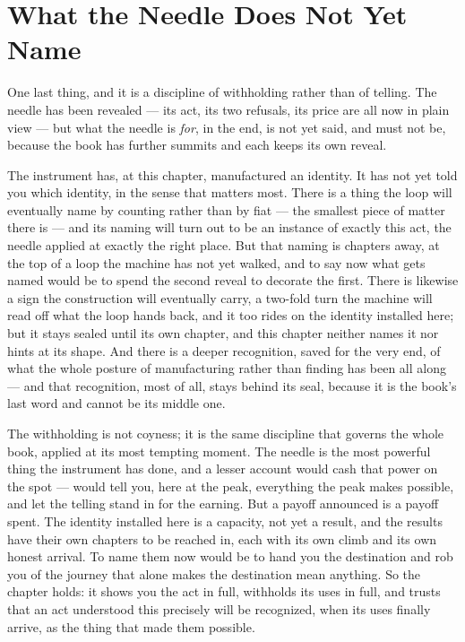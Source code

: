 \section{What the Needle Does Not Yet Name}

One last thing, and it is a discipline of withholding rather than of telling. The needle has been revealed --- its
act, its two refusals, its price are all now in plain view --- but what the needle is \emph{for}, in the end, is
not yet said, and must not be, because the book has further summits and each keeps its own reveal.

The instrument has, at this chapter, manufactured an identity. It has not yet told you which identity, in the
sense that matters most. There is a thing the loop will eventually name by counting rather than by fiat --- the
smallest piece of matter there is --- and its naming will turn out to be an instance of exactly this act, the
needle applied at exactly the right place. But that naming is chapters away, at the top of a loop the machine has
not yet walked, and to say now what gets named would be to spend the second reveal to decorate the first. There is
likewise a sign the construction will eventually carry, a two-fold turn the machine will read off what the loop
hands back, and it too rides on the identity installed here; but it stays sealed until its own chapter, and this
chapter neither names it nor hints at its shape. And there is a deeper recognition, saved for the very end, of
what the whole posture of manufacturing rather than finding has been all along --- and that recognition, most of
all, stays behind its seal, because it is the book's last word and cannot be its middle one.

The withholding is not coyness; it is the same discipline that governs the whole book, applied at its most
tempting moment. The needle is the most powerful thing the instrument has done, and a lesser account would cash
that power on the spot --- would tell you, here at the peak, everything the peak makes possible, and let the
telling stand in for the earning. But a payoff announced is a payoff spent. The identity installed here is a
capacity, not yet a result, and the results have their own chapters to be reached in, each with its own climb and
its own honest arrival. To name them now would be to hand you the destination and rob you of the journey that
alone makes the destination mean anything. So the chapter holds: it shows you the act in full, withholds its uses
in full, and trusts that an act understood this precisely will be recognized, when its uses finally arrive, as the
thing that made them possible.

